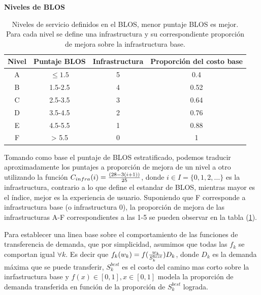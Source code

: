 \documentclass{article}
\begin{document}
  \begin{table}[h!]
    \centering
    \caption*{{\bf Niveles de BLOS}}
    \begin{tabular}{cccc}
      \toprule
        Nivel & Puntaje BLOS & Infrastructura & Proporción del costo base \\
      \midrule
        A     & $\leq 1.5$   & 5              & 0.4   \\
        B     & 1.5-2.5      & 4              & 0.52  \\
        C     & 2.5-3.5      & 3              & 0.64  \\
        D     & 3.5-4.5      & 2              & 0.76  \\
        E     & 4.5-5.5      & 1              & 0.88  \\
        F     & > 5.5        & 0              & 1     \\
      \bottomrule
    \end{tabular}
    \caption{Niveles de servicio definidos en el BLOS, menor puntaje BLOS es mejor. Para cada nivel se define una infrastructura y su correspondiente proporción de mejora sobre la infrastructura base.}\label{table:blosscores}
  \end{table}

  Tomando como base el puntaje de BLOS estratificado, podemos traducir aproximadamente los puntajes a proporción de mejora de un nivel a otro utilizando la función $C_{infra}(i) = {(28 - 3 (i + 1)) \over 25}$, donde $i \in I = \{0,1,2,\ldots\}$ es la infrastructura, contrario a lo que define el estandar de BLOS, mientras mayor es el índice, mejor es la experiencia de usuario. Suponiendo que F corresponde a infrastructura base (o infrastructura 0), la proporción de mejora de las infrastructuras A-F correspondientes a las 1-5 se pueden observar en la tabla  (\ref{table:blosscores}).

  Para establecer una linea base sobre el comportamiento de las funciones de transferencia de demanda, que por simplicidad, asumimos que todas las $f_k$ se comportan igual $\forall k$. Es decir que $f_k(w_k) = f({w_k \over S^{best}_k})D_k$, donde $D_k$ es la demanda máxima que se puede transferir, $S^{best}_k$ es el costo del camino mas corto sobre la inrfastructura base y $f(x) \in [0, 1], x \in [0, 1]$ modela la proporción de demanda transferida en función de la proporción de $S^{best}_k$ lograda.
\end{document}
